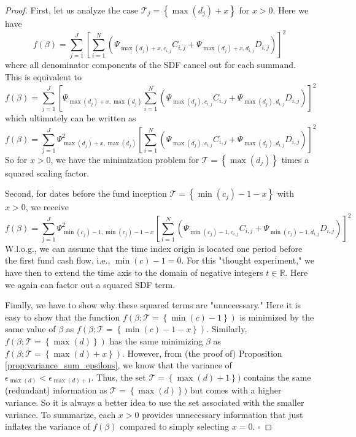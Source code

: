 \begin{proof}
	First, let us analyze the case $\mathcal{T}_j = \left\{ \max (d_j) + x \right\}$ for $x>0$.
	Here we have
	\[
	f(\beta) = \sum_{j=1}^J \left[
	\sum_{i=1}^N \left( \Psi_{\max (d_j) + x, c_{i,j}} C_{i,j} + \Psi_{\max (d_j) + x,d_{i,j}} D_{i,j} \right)
	\right]^2
	\]
	where all denominator components of the SDF cancel out for each summand.
	This is equivalent to
	\[
	f(\beta) = \sum_{j=1}^J \left[
	\Psi_{\max (d_j) + x, \max (d_j)}
	\sum_{i=1}^N \left( \Psi_{\max (d_j), c_{i,j}} C_{i,j} + \Psi_{\max (d_j),d_{i,j}} D_{i,j} \right)
	\right]^2
	\]
	which ultimately can be written as
	\[
	f(\beta) = 
	\sum_{j=1}^J \Psi_{\max (d_j) + x, \max (d_j)}^2
	\left[
	\sum_{i=1}^N \left( \Psi_{\max (d_j), c_{i,j}} C_{i,j} + \Psi_{\max (d_j),d_{i,j}} D_{i,j} \right)
	\right]^2
	\]
	So for $x > 0$, we have the minimization problem for $\mathcal{T} = \left\{ \max (d_j) \right\}$ times a squared scaling factor.
	
	Second, for dates before the fund inception $\mathcal{T} = \left\{ \min (c_j) - 1 - x \right\}$ with $x > 0$, we receive
	\[
	f(\beta) = 
	\sum_{j=1}^J \Psi_{\min (c_j) - 1, \min (c_j) - 1 - x}^2
	\left[
	\sum_{i=1}^N \left( \Psi_{\min (c_j) - 1, c_{i,j}} C_{i,j} + \Psi_{\min (c_j) - 1, d_{i,j}} D_{i,j} \right)
	\right]^2
	\]
	W.l.o.g., we can assume that the time index origin is located one period before the first fund cash flow, i.e., $\min (c) - 1 = 0$.
	For this "thought experiment," we have then to extend the time axis to the domain of negative integers $t \in \mathbb{R}$.
	Here we again can factor out a squared SDF term.
	
	Finally, we have to show why these squared terms are "unnecessary."
	Here it is easy to show that the function $f(\beta; \mathcal{T} = \left\{ \min (c) - 1 \right\})$ is minimized by the same value of $\beta$ as $f(\beta; \mathcal{T} = \left\{ \min (c) - 1 - x \right\})$.
	Similarly, $f(\beta; \mathcal{T} = \left\{ \max (d) \right\})$ has the same minimizing $\beta$ as $f(\beta; \mathcal{T} = \left\{ \max (d) + x \right\})$.
	However, from (the proof of) Proposition \ref{prop:variance_sum_epsilons}, we know that the variance of $\epsilon_{\max(d)} < \epsilon_{\max(d) + 1}$.
	Thus, the set $\mathcal{T} = \left\{ \max (d) + 1 \right\})$ contains the same (redundant) information as $\mathcal{T} = \left\{ \max (d) \right\})$ but comes with a higher variance.
	So it is always a better idea to use the set associated with the smaller variance.
	To summarize, each $x > 0$ provides unnecessary information that just inflates the variance of $f(\beta)$ compared to simply selecting $x=0$.
	$\square$
\end{proof}


